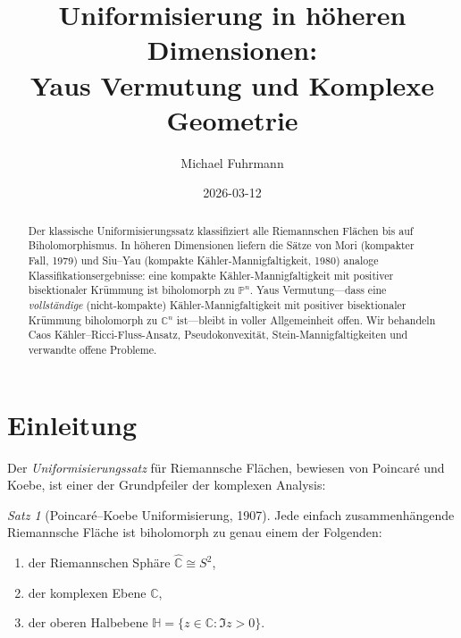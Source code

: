 \documentclass[12pt,a4paper]{amsart}
\theoremstyle{definition}
\theoremstyle{remark}
\newtheorem{satz}[theorem]{Satz}
\newcommand{\CC}{\mathbb{C}}
\newcommand{\PP}{\mathbb{P}}
\begin{document}
\begin{abstract}
Der klassische Uniformisierungssatz klassifiziert alle Riemannschen Flächen
bis auf Biholomorphismus.  In höheren Dimensionen liefern die Sätze von
Mori (kompakter Fall, 1979) und Siu--Yau (kompakte Kähler-Mannigfaltigkeit,
1980) analoge Klassifikationsergebnisse: eine kompakte Kähler-Mannigfaltigkeit
mit positiver bisektionaler Krümmung ist biholomorph zu $\PP^n$.
Yaus Vermutung---dass eine \emph{vollständige} (nicht-kompakte) Kähler-Mannig\-faltigkeit
mit positiver bisektionaler Krümmung biholomorph zu $\CC^n$ ist---bleibt
in voller Allgemeinheit offen.  Wir behandeln Caos Kähler--Ricci-Fluss-Ansatz,
Pseudokonvexität, Stein-Mannigfaltigkeiten und verwandte offene Probleme.
\end{abstract}

\title{Uniformisierung in höheren Dimensionen:\\
\large Yaus Vermutung und Komplexe Geometrie}

\author{Michael Fuhrmann}
\address{Specialist Mathematics Project, Build 169}
\date{2026-03-12}

\maketitle
\tableofcontents

\section{Einleitung}

Der \emph{Uniformisierungssatz} für Riemannsche Flächen, bewiesen von
Poincaré und Koebe, ist einer der Grundpfeiler der komplexen Analysis:

\begin{satz}[Poincaré--Koebe Uniformisierung, 1907]
Jede einfach zusammenhängende Riemannsche Fläche ist biholomorph zu genau
einem der Folgenden:
\begin{enumerate}[label=(\roman*)]
  \item der Riemannschen Sphäre $\hat{\CC} \cong S^2$,
  \item der komplexen Ebene $\CC$,
  \item der oberen Halbebene $\mathbb{H} = \{z \in \CC : \Im z > 0\}$.
\end{enumerate}
\end{satz}
\end{document}
